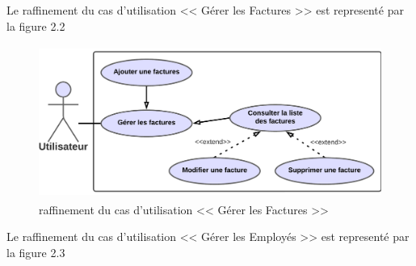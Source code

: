\documentclass[12pt]{report}
\begin{document}
Le raffinement du cas d'utilisation << Gérer les Factures >> est representé par la figure 2.2

\begin{figure}[H]
  \centering
  \includegraphics[width=15cm,height=5cm]{gererfact}
  \caption{raffinement du cas d'utilisation << Gérer les Factures >> }
  \label{fig:votre-label}
\end{figure}
Le raffinement du cas d'utilisation << Gérer les Employés >> est representé par la figure 2.3
\end{document}
